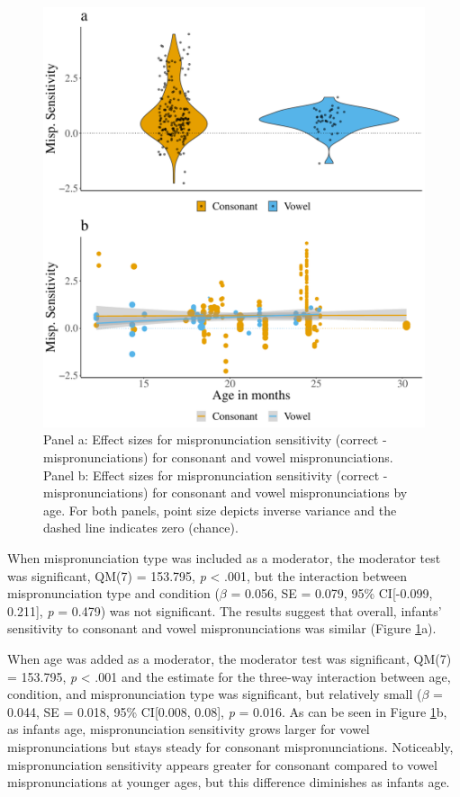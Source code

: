 \documentclass[man]{apa6}
\begin{document}
\begin{figure}
\centering
\includegraphics{VonHolzenBergmann_MPMetaAnalysis_files/figure-latex/PlotMispType-1.pdf}
\caption{\label{fig:PlotMispType}Panel a: Effect sizes for mispronunciation sensitivity (correct - mispronunciations) for consonant and vowel mispronunciations. Panel b: Effect sizes for mispronunciation sensitivity (correct - mispronunciations) for consonant and vowel mispronunciations by age. For both panels, point size depicts inverse variance and the dashed line indicates zero (chance).}
\end{figure}

When mispronunciation type was included as a moderator, the moderator test was significant, QM(7) = 153.795, \emph{p} \textless{} .001, but the interaction between mispronunciation type and condition (\(\beta\) = 0.056, SE = 0.079, 95\% CI{[}-0.099, 0.211{]}, \emph{p} = 0.479) was not significant. The results suggest that overall, infants' sensitivity to consonant and vowel mispronunciations was similar (Figure \ref{fig:PlotMispType}a).

When age was added as a moderator, the moderator test was significant, QM(7) = 153.795, \emph{p} \textless{} .001 and the estimate for the three-way interaction between age, condition, and mispronunciation type was significant, but relatively small (\(\beta\) = 0.044, SE = 0.018, 95\% CI{[}0.008, 0.08{]}, \emph{p} = 0.016. As can be seen in Figure \ref{fig:PlotMispType}b, as infants age, mispronunciation sensitivity grows larger for vowel mispronunciations but stays steady for consonant mispronunciations. Noticeably, mispronunciation sensitivity appears greater for consonant compared to vowel mispronunciations at younger ages, but this difference diminishes as infants age.
\end{document}
